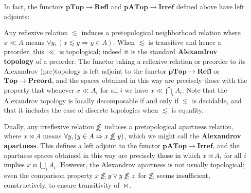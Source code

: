 \documentclass{article}
\def\oapt{\mathrel{\!\not\,\not\lesssim}}
\def\leapx{\lesssim}
\let\implies\Rightarrow
\def\inv{^{-1}}
\def\Preord{\mathbf{Preord}}
\def\PTop{\mathbf{pTop}}
\def\Top{\mathbf{Top}}
\def\APTop{\mathbf{pATop}}
\begin{document}
In fact, the functors $\PTop \to \mathbf{Refl}$ and $\APTop \to \mathbf{Irref}$ defined above have left adjoints:

\begin{eg}\label{eg:alexandrov}
  Any reflexive relation $\leapx$ induces a pretopological neighborhood relation where $x\ll A$ means $\forall y, (x\leapx y \implies y\in A)$.
  When $\leapx$ is transitive and hence a preorder, this $\ll$ is topological; indeed it is the standard \textbf{Alexandrov topology} of a preorder.
  The functor taking a reflexive relation or preorder to its Alexandrov (pre)topology is left adjoint to the functor $\PTop \to \mathbf{Refl}$ or $\Top \to \Preord$, and the spaces obtained in this way are precisely those with the property that whenever $x\ll A_i$ for all $i$ we have $x\ll \bigcap_i A_i$.
  Note that the Alexandrov topology is locally decomposable if and only if $\leapx$ is decidable, and that it includes the case of discrete topologies when $\leapx$ is equality.
  


  Dually, any irreflexive relation $\oapt$ induces a pretopological apartness relation, where $x\bowtie A$ means $\forall y, (y\in A \implies x\oapt y)$, which we might call the \textbf{Alexandrov apartness}.
  This defines a left adjoint to the functor $\APTop \to \mathbf{Irref}$, and the apartness spaces obtained in this way are precisely those in which $x\bowtie A_i$ for all $i$ implies $x\bowtie \bigcup_i A_i$.
  However, the Alexandrov apartness is not usually topological; even the comparison property $x\oapt y \lor y\oapt z$ for $\oapt$ seems insufficient, constructively, to ensure transitivity of $\bowtie$.
\end{eg}
\end{document}
